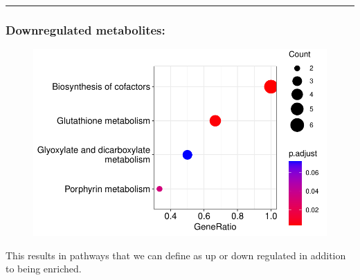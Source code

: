 \documentclass[
  24px,
  letterpaper,
  DIV=11,
  numbers=noendperiod]{scrartcl}
\newenvironment{Shaded}{\begin{snugshade}}{\end{snugshade}}
\newcommand{\AttributeTok}[1]{\textcolor[rgb]{0.40,0.45,0.13}{#1}}
\newcommand{\DecValTok}[1]{\textcolor[rgb]{0.68,0.00,0.00}{#1}}
\newcommand{\FloatTok}[1]{\textcolor[rgb]{0.68,0.00,0.00}{#1}}
\newcommand{\FunctionTok}[1]{\textcolor[rgb]{0.28,0.35,0.67}{#1}}
\newcommand{\NormalTok}[1]{\textcolor[rgb]{0.00,0.23,0.31}{#1}}
\newcommand{\OtherTok}[1]{\textcolor[rgb]{0.00,0.23,0.31}{#1}}
\newcommand{\SpecialCharTok}[1]{\textcolor[rgb]{0.37,0.37,0.37}{#1}}
\begin{document}
\begin{center}\rule{0.5\linewidth}{0.5pt}\end{center}

\hypertarget{downregulated-metabolites}{%
\subsubsection{Downregulated
metabolites:}\label{downregulated-metabolites}}

\begin{Shaded}
\end{Shaded}

\begin{figure}[H]

{\centering \includegraphics{index_files/figure-pdf/unnamed-chunk-32-1.pdf}

}

\end{figure}

This results in pathways that we can define as up or down regulated in
addition to being enriched.
\end{document}
